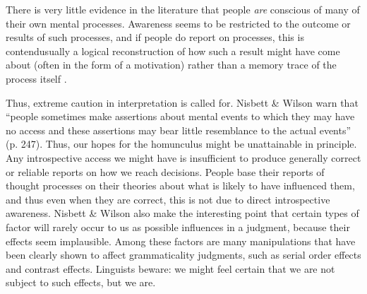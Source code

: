 There is very little evidence in the literature that people \textit{are} conscious of many of their own mental processes. Awareness seems to be restricted to the outcome or results of such processes, and if people do report on processes, this is\schdash{}\citet{NisbettEtAl1977} contend\schdash{}usually a logical reconstruction of how such a result might have come about (often in the form of a motivation) rather than a memory trace of the process itself  \citep[7]{LeveltEtAl1978}.

Thus, extreme caution in interpretation is called for. Nisbett \& Wilson warn that ``people sometimes make assertions about mental events to which they may have no access and these assertions may bear little resemblance to the actual events'' (p. 247). Thus, our hopes for the homunculus might be unattainable in principle. Any introspective access we might have is insufficient to produce generally correct or reliable reports on how we reach decisions. People base their reports of thought processes on their theories about what is likely to have influenced them, and thus even when they are correct, this is not due to direct introspective awareness. Nisbett \& Wilson also make the interesting point that certain types of factor will  rarely occur to us as possible influences in a judgment, because their effects seem implausible. Among these factors are many manipulations that have been clearly shown to affect grammaticality judgments, such as serial order effects and contrast effects. Linguists beware: we might feel certain that we are not subject to such effects, but we are.

